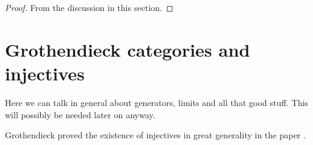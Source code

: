 \begin{proof}
From the discussion in this section.
\end{proof}




















\section{Grothendieck categories and injectives}

\noindent
Here we can talk in general about generators, limits and
all that good stuff. This will possibly be needed later on
anyway.

\medskip\noindent
Grothendieck proved the existence of injectives in great generality 
in the paper \cite{Tohoku}. 









